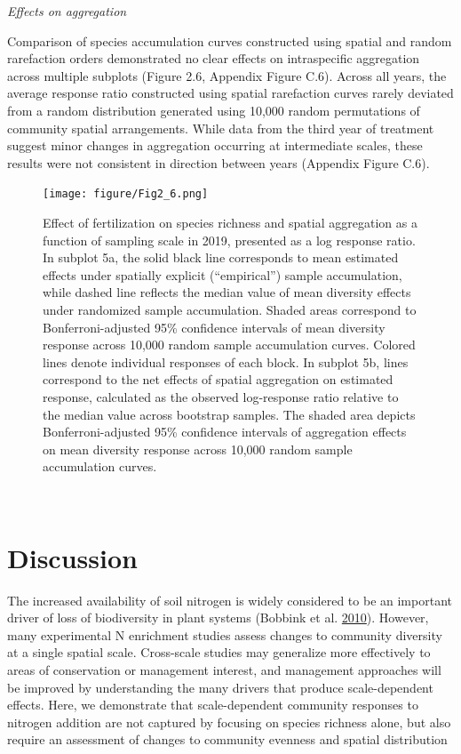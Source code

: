 \documentclass[twoside,12pt,final]{ucthesis-CA2012}
\begin{document}
\begin{ucmainmatter}
\emph{Effects on aggregation}

Comparison of species accumulation curves constructed using spatial and random rarefaction orders demonstrated no clear effects on intraspecific aggregation across multiple subplots (Figure 2.6, Appendix Figure C.6). Across all years, the average response ratio constructed using spatial rarefaction curves rarely deviated from a random distribution generated using 10,000 random permutations of community spatial arrangements. While data from the third year of treatment suggest minor changes in aggregation occurring at intermediate scales, these results were not consistent in direction between years (Appendix Figure C.6).
\begin{figure}
\centering
\texttt{[image: figure/Fig2\_6.png]}
\caption{Effect of fertilization on species richness and spatial aggregation as a function of sampling scale in 2019, presented as a log response ratio. In subplot 5a, the solid black line corresponds to mean estimated effects under spatially explicit (``empirical'') sample accumulation, while dashed line reflects the median value of mean diversity effects under randomized sample accumulation. Shaded areas correspond to Bonferroni-adjusted 95\% confidence intervals of mean diversity response across 10,000 random sample accumulation curves. Colored lines denote individual responses of each block. In subplot 5b, lines correspond to the net effects of spatial aggregation on estimated response, calculated as the observed log-response ratio relative to the median value across bootstrap samples. The shaded area depicts Bonferroni-adjusted 95\% confidence intervals of aggregation effects on mean diversity response across 10,000 random sample accumulation curves. \label{fig-2-6}}
\end{figure}
~

\hypertarget{discussion}{%
\section{Discussion}\label{discussion}}

The increased availability of soil nitrogen is widely considered to be an important driver of loss of biodiversity in plant systems (Bobbink et al. \protect\hyperlink{ref-bobbink2010}{2010}). However, many experimental N enrichment studies assess changes to community diversity at a single spatial scale. Cross-scale studies may generalize more effectively to areas of conservation or management interest, and management approaches will be improved by understanding the many drivers that produce scale-dependent effects. Here, we demonstrate that scale-dependent community responses to nitrogen addition are not captured by focusing on species richness alone, but also require an assessment of changes to community evenness and spatial distribution


\end{ucmainmatter}
\end{document}
